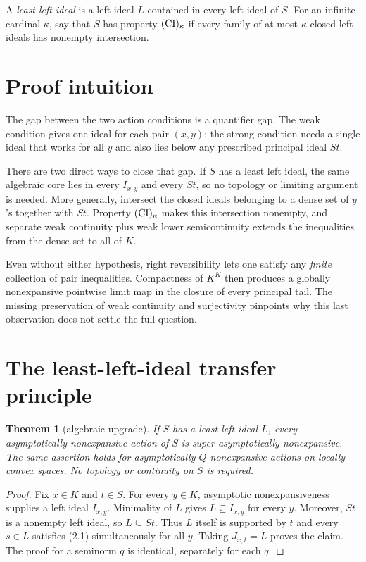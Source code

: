 \documentclass[11pt]{article}
\newtheorem{theorem}{Theorem}
\theoremstyle{definition}
\theoremstyle{remark}
\begin{document}
A \emph{least left ideal} is a left ideal $L$ contained in every left ideal
of $S$.  For an infinite cardinal $\kappa$, say that $S$ has property
$({\rm CI})_\kappa$ if every family of at most $\kappa$ closed left ideals
has nonempty intersection.

\section{Proof intuition}

The gap between the two action conditions is a quantifier gap.  The weak
condition gives one ideal for each pair $(x,y)$; the strong condition needs a
single ideal that works for all $y$ and also lies below any prescribed
principal ideal $St$.

There are two direct ways to close that gap.  If $S$ has a least left ideal,
the same algebraic core lies in every $I_{x,y}$ and every $St$, so no
topology or limiting argument is needed.  More generally, intersect the
closed ideals belonging to a dense set of $y$'s together with $St$.
Property $({\rm CI})_\kappa$ makes this intersection nonempty, and separate
weak continuity plus weak lower semicontinuity extends the inequalities from
the dense set to all of $K$.

Even without either hypothesis, right reversibility lets one satisfy any
\emph{finite} collection of pair inequalities.  Compactness of $K^K$ then
produces a globally nonexpansive pointwise limit map in the closure of every
principal tail.  The missing preservation of weak continuity and
surjectivity pinpoints why this last observation does not settle the full
question.

\section{The least-left-ideal transfer principle}

\begin{theorem}[algebraic upgrade]\label{thm:least}
If $S$ has a least left ideal $L$, every asymptotically nonexpansive action of
$S$ is super asymptotically nonexpansive.  The same assertion holds for
asymptotically $Q$-nonexpansive actions on locally convex spaces.  No topology
or continuity on $S$ is required.
\end{theorem}

\begin{proof}
Fix $x\in K$ and $t\in S$.  For every $y\in K$, asymptotic
nonexpansiveness supplies a left ideal $I_{x,y}$.  Minimality of $L$ gives
$L\subseteq I_{x,y}$ for every $y$.  Moreover, $St$ is a nonempty left ideal,
so $L\subseteq St$.  Thus $L$ itself is supported by $t$ and every $s\in L$
satisfies (2.1) simultaneously for all $y$.  Taking $J_{x,t}=L$ proves the
claim.  The proof for a seminorm $q$ is identical, separately for each $q$.
\end{proof}
\end{document}
